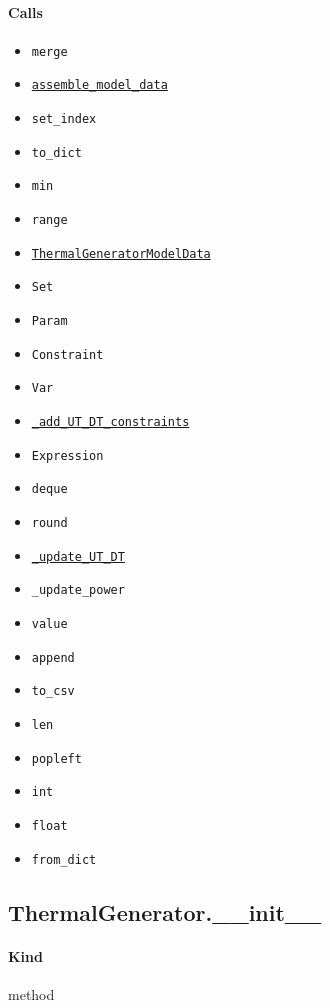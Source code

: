 \documentclass[11pt]{report}
\begin{document}
\paragraph{Calls}
\begin{itemize}[leftmargin=*]
  \item \texttt{merge}
  \item \hyperref[def:examples-thermal_generator.py:ThermalGenerator.assemble_model_data:L66]{\texttt{assemble\_model\_data}}
  \item \texttt{set\_index}
  \item \texttt{to\_dict}
  \item \texttt{min}
  \item \texttt{range}
  \item \hyperref[def:model_data.py:ThermalGeneratorModelData:L185]{\texttt{ThermalGeneratorModelData}}
  \item \texttt{Set}
  \item \texttt{Param}
  \item \texttt{Constraint}
  \item \texttt{Var}
  \item \hyperref[def:examples-thermal_generator.py:ThermalGenerator._add_UT_DT_constraints:L174]{\texttt{\_add\_UT\_DT\_constraints}}
  \item \texttt{Expression}
  \item \texttt{deque}
  \item \texttt{round}
  \item \hyperref[def:examples-thermal_generator.py:ThermalGenerator._update_UT_DT:L480]{\texttt{\_update\_UT\_DT}}
  \item \texttt{\_update\_power}
  \item \texttt{value}
  \item \texttt{append}
  \item \texttt{to\_csv}
  \item \texttt{len}
  \item \texttt{popleft}
  \item \texttt{int}
  \item \texttt{float}
  \item \texttt{from\_dict}
\end{itemize}
\subsection{ThermalGenerator.\_\_init\_\_}
\label{def:examples-thermal_generator.py:ThermalGenerator.__init__:L36}
\paragraph{Kind} method
\end{document}
